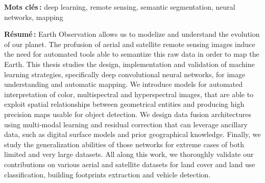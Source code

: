{\begin{titlepage}
\begin{minipage}{\textwidth}
\textbf{Mots clés\,:} deep learning, remote sensing, semantic segmentation, neural networks, mapping
\begin{multicols}{2}
\textbf{Résumé\,:}
Earth Observation allows us to modelize and understand the evolution of our planet. The profusion of aerial and satellite remote sensing images induce the need for automated tools able to semantize this raw data in order to map the Earth. This thesis studies the design, implementation and validation of machine learning strategies, specifically deep convolutional neural networks, for image understanding and automatic mapping. We introduce models for automated interpretation of color, multispectral and hyperspectral images, that are able to exploit spatial relationships between geometrical entities and producing high precision maps usable for object detection. We design data fusion architectures using multi-modal learning and residual correction that can leverage ancillary data, such as digital surface models and prior geographical knowledge. Finally, we study the generalization abilities of those networks for extreme cases of both limited and very large datasets. All along this work, we thoroughly validate our contributions on various aerial and satellite datasets for land cover and land use classification, building footprints extraction and vehicle detection.
\end{multicols}
\end{minipage}
\end{titlepage}

\restoregeometry
}
\makeatother
